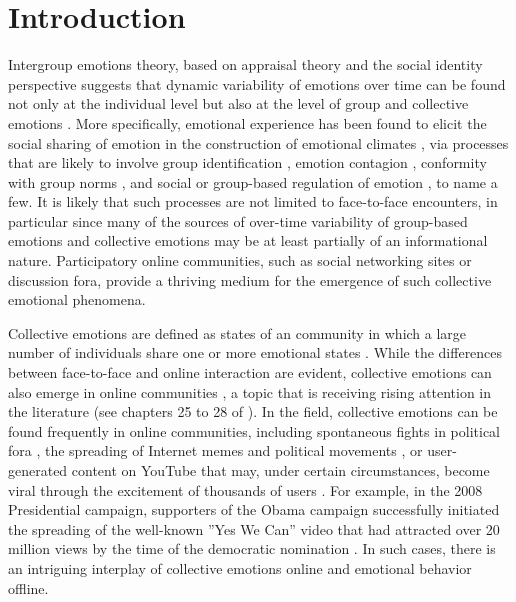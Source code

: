 \documentclass[nologo,url,11pt,a4paper]{ETHpaper}
\begin{document}
\section{Introduction}

Intergroup emotions theory, based on appraisal theory \cite{Lazarus1991,Smith1985,Scherer2001} and the social identity perspective \cite{Turner1987} suggests that dynamic variability of emotions over time can be found not only at the individual level but also at the level of group and collective emotions \cite{Smith2015,Scheve2013}. More specifically, emotional experience has been found to elicit the social sharing of emotion in the construction of emotional climates \cite{Rime2009,Rime2007}, via processes that are likely to involve group identification \cite{Smith2007}, emotion contagion \cite{Weisbuch2008}, conformity with group norms \cite{Turner1987}, and social or  group-based regulation of emotion \cite{Kappas2013,Smith2015}, to name a few. It is likely that such processes are not limited to face-to-face encounters, in particular since many of the sources 
of over-time variability of group-based emotions  \cite{Smith2015} and collective emotions  \cite{Scheve2013} may be at least partially of an informational nature.
Participatory online communities, such as social networking sites or discussion fora, provide a thriving medium for the emergence of such collective emotional phenomena.

Collective emotions are defined as states of an community in which a large number of individuals share one or more emotional states \cite{Scheve2013,Kappas2013}. While the differences between face-to-face and online interaction are evident, collective emotions can also emerge in online communities \cite{Schweitzer2010,Scheve2014}, a topic that is receiving rising attention in the literature (see chapters 25 to 28 of \cite{Scheve2014}).
In the field, collective emotions can be found frequently in online communities, including spontaneous fights in political fora \cite{Chmiel2011}, the spreading of Internet memes \cite{Guadagno2013} and political movements \cite{Alvarez2015}, or user-generated content on YouTube that may, under certain circumstances, become viral through the excitement of thousands of users \cite{Shifman2012,Garcia2012}.
For example, in the 2008 Presidential campaign, supporters of the Obama campaign successfully initiated the spreading of the well-known ''Yes We Can'' video that had attracted over 20 million views by the time of the democratic nomination \cite{Wallsten2010}. 
In such cases, there is an intriguing interplay of collective emotions online and emotional behavior offline.
\end{document}
